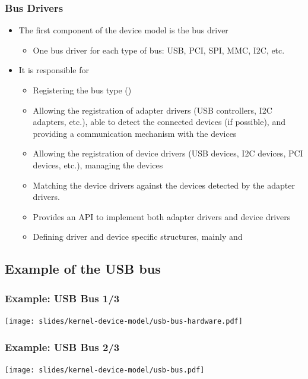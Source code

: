 \begin{frame}
  \frametitle{Bus Drivers}
  \begin{itemize}
  \item The first component of the device model is the bus driver
    \begin{itemize}
    \item One bus driver for each type of bus: USB, PCI, SPI, MMC,
      I2C, etc.
    \end{itemize}
  \item It is responsible for
    \begin{itemize}
    \item Registering the bus type ()
    \item Allowing the registration of adapter drivers (USB
      controllers, I2C adapters, etc.), able to detect the
      connected devices (if possible), and providing a
      communication mechanism with the devices
    \item Allowing the registration of device drivers (USB devices,
      I2C devices, PCI devices, etc.), managing the devices
    \item Matching the device drivers against the devices detected by
      the adapter drivers.
    \item Provides an API to implement both adapter drivers and device drivers
    \item Defining driver and device specific structures, mainly
       and 
    \end{itemize}
  \end{itemize}
\end{frame}

\subsection{Example of the USB bus}

\begin{frame}
\frametitle{Example: USB Bus 1/3}
  \begin{center}
    \texttt{[image: slides/kernel-device-model/usb-bus-hardware.pdf]}
  \end{center}
\end{frame}

\begin{frame}
\frametitle{Example: USB Bus 2/3}
  \begin{center}
    \texttt{[image: slides/kernel-device-model/usb-bus.pdf]}
  \end{center}
\end{frame}

